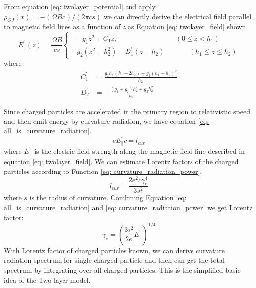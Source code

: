 \documentclass[12pt]{report}
\begin{document}
      From equation \ref{eq: twolayer_potential} and apply $\rho_{GJ}\left(x\right)=-\left(\Omega B x\right)/\left(2\pi cs\right)$ 
      we can directly derive the electrical field parallel to magnetic field lines as a function of $z$
      as Equation \ref{eq: twolayer_field} shown.
      \begin{equation}
        \label{eq: twolayer_field}
          E^{\prime}_{\parallel}\left(z\right) = \frac{\Omega B}{cs}
          \left\{\begin{alignedat}{2}
             & -g_1 z^2 + C_1^{\prime}z ,  &&\left(0 \leq z < h_{1}\right)\\
             & g_2\left(z^2 - h_2^2\right) + D_1^{\prime}\left(z-h_2\right)  &&\qquad \left(h_{1} \leq z \leq h_{2}\right) 
          \end{alignedat}\right.
      \end{equation}
      where 
      \begin{align*}
        C_{1}^{\prime} &= \frac{g_1 h_1 \left(h_1 - 2h_2\right)+ g_2\left(h_1-h_2\right)^2}{h_2} \\
        D_{2}^{\prime} &= -\frac{\left(g_1 + g_2\right)h_2^2 + g_2 h_2^2}{h_2}
      \end{align*}

      Since charged particles are accelerated in the primary region to relativistic speed 
      and then emit energy by curvature radiation, we have equation \ref{eq: all_is_curvature_radiation}.
      \begin{equation}
        \label{eq: all_is_curvature_radiation}
        e E_{\parallel}^{\prime} c = l_{cur}
      \end{equation}
      where $E_\parallel^{\prime}$ is the electric field strength along the magnetic field line 
      described in equation \ref{eq: twolayer_field}.
      We can estimate Lorentz factors of the charged particles according to Function 
      \ref{eq: curvature_radiation_power}.
      \begin{equation}
        \label{eq: curvature_radiation_power}
        l_{cur} = \frac{2 e^2 c \gamma^{4}_{e}}{3s^2}
      \end{equation}      
      where $s$ is the radius of curvature. 
      Combining Equation \ref{eq: all_is_curvature_radiation} and 
      \ref{eq: curvature_radiation_power} we get Lorentz factor: 
      \begin{equation}
        \label{eq: gamma_can_be_zero}
        \gamma_{e} = \left(\frac{3s^2}{2e} E_{\parallel}^{\prime}\right)^{1/4}
      \end{equation}
      With Lorentz factor of charged particles known, we can derive curvature radiation spectrum
      for single charged particle and then can get the total spectrum by integrating over all 
      charged particles. This is the simplified basic idea of the Two-layer model. 
\end{document}
